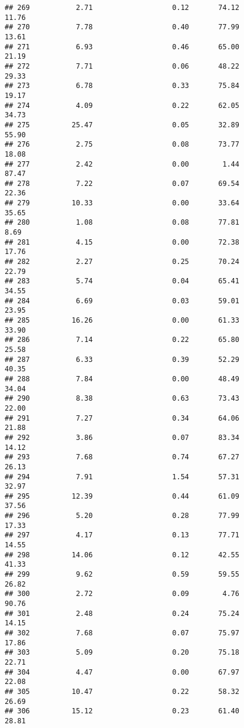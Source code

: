 \documentclass[
]{article}
\begin{document}
\begin{verbatim}
## 269           2.71                   0.12       74.12          11.76
## 270           7.78                   0.40       77.99          13.61
## 271           6.93                   0.46       65.00          21.19
## 272           7.71                   0.06       48.22          29.33
## 273           6.78                   0.33       75.84          19.17
## 274           4.09                   0.22       62.05          34.73
## 275          25.47                   0.05       32.89          55.90
## 276           2.75                   0.08       73.77          18.08
## 277           2.42                   0.00        1.44          87.47
## 278           7.22                   0.07       69.54          22.36
## 279          10.33                   0.00       33.64          35.65
## 280           1.08                   0.08       77.81           8.69
## 281           4.15                   0.00       72.38          17.76
## 282           2.27                   0.25       70.24          22.79
## 283           5.74                   0.04       65.41          34.55
## 284           6.69                   0.03       59.01          23.95
## 285          16.26                   0.00       61.33          33.90
## 286           7.14                   0.22       65.80          25.58
## 287           6.33                   0.39       52.29          40.35
## 288           7.84                   0.00       48.49          34.04
## 290           8.38                   0.63       73.43          22.00
## 291           7.27                   0.34       64.06          21.88
## 292           3.86                   0.07       83.34          14.12
## 293           7.68                   0.74       67.27          26.13
## 294           7.91                   1.54       57.31          32.97
## 295          12.39                   0.44       61.09          37.56
## 296           5.20                   0.28       77.99          17.33
## 297           4.17                   0.13       77.71          14.55
## 298          14.06                   0.12       42.55          41.33
## 299           9.62                   0.59       59.55          26.82
## 300           2.72                   0.09        4.76          90.76
## 301           2.48                   0.24       75.24          14.15
## 302           7.68                   0.07       75.97          17.86
## 303           5.09                   0.20       75.18          22.71
## 304           4.47                   0.00       67.97          22.08
## 305          10.47                   0.22       58.32          26.69
## 306          15.12                   0.23       61.40          28.81

\end{verbatim}
\end{document}
